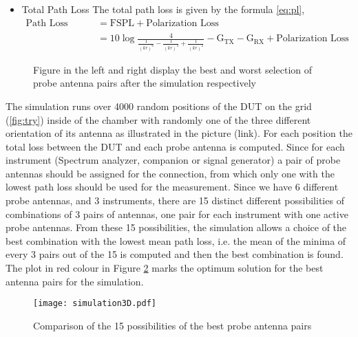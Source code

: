 \begin{itemize}
  \item Total Path Loss
  The total path loss is given by the formula \ref{eq:pl},
  \begin{equation}  \label{eq:pl}
  \begin{split}
  \mbox{Path Loss (k,r)}  & = \mbox{FSPL} + \mbox{Polarization Loss} \\
  &= 10 \log\frac{4}{\frac{1}{(kr)^6}-\frac{1}{(kr)^4}+\frac{1}{(kr)^2}} - \mbox{G}_{\mbox{TX}} - \mbox{G}_{\mbox{RX}} + \mbox{Polarization Loss}
 \end{split}
 \end{equation}
   
   \end{itemize}

\begin{figure}[H]
  \hspace{-3cm}
   \vspace{-3.5cm}
\caption{Figure in the left and right display the best and worst selection of probe antenna pairs after the simulation respectively}
\label{fig:simu}
\end{figure}


The simulation runs over 4000 random positions of the \acs{DUT} on the grid (\ref{fig:try}) inside of the chamber with randomly one of the three different orientation of its antenna as illustrated in the picture (link). For each position the total loss between the \acs{DUT} and each probe antenna is computed. Since for each instrument (Spectrum analyzer, companion or signal generator) a pair of probe antennas should be assigned for the connection, from which only one with the lowest path loss should be used for the measurement. Since we have 6 different probe antennas, and 3 instruments, there are 15 distinct different possibilities of combinations of 3 pairs of antennas, one pair for each instrument with one active probe antennas. From these 15 possibilities, the simulation allows a choice of the best combination with the lowest mean path loss, i.e. the mean of the minima of every 3 pairs out of the 15 is computed and then the best combination is found. The plot in red colour in Figure \ref{fig:3D} marks the optimum solution for the best antenna pairs for the simulation.

  \begin{figure}[H]
\centering
\texttt{[image: simulation3D.pdf]}
\caption{Comparison of the 15 possibilities of the best probe antenna pairs }
\label{fig:3D} 
\end{figure}


